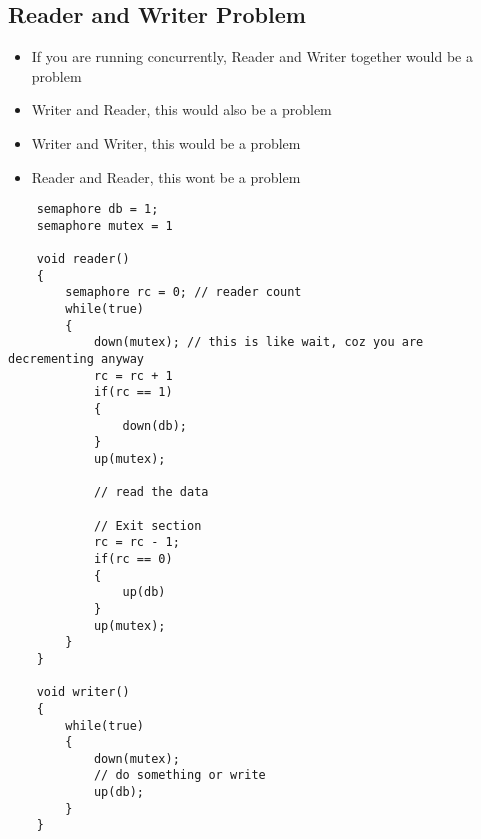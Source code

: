 \documentclass[11pt]{article}
\begin{document}
\subsection{Reader and Writer Problem}

\begin{itemize}
	\item If you are running concurrently, Reader and Writer together would be a problem
	\item Writer and Reader, this would also be a problem
	\item Writer and Writer, this would be a problem
	\item Reader and Reader, this wont be a problem
\end{itemize}

\begin{lstlisting}
	semaphore db = 1;
	semaphore mutex = 1

	void reader()
	{
		semaphore rc = 0; // reader count
		while(true)
		{
			down(mutex); // this is like wait, coz you are decrementing anyway
			rc = rc + 1
			if(rc == 1)
			{
				down(db);
			}
			up(mutex);
			
			// read the data 
			
			// Exit section
			rc = rc - 1;
			if(rc == 0)
			{
				up(db)
			}
			up(mutex);
		}
	}

	void writer()
	{
		while(true)
		{
			down(mutex);
			// do something or write
			up(db);
		}
	}


\end{lstlisting}
\end{document}
